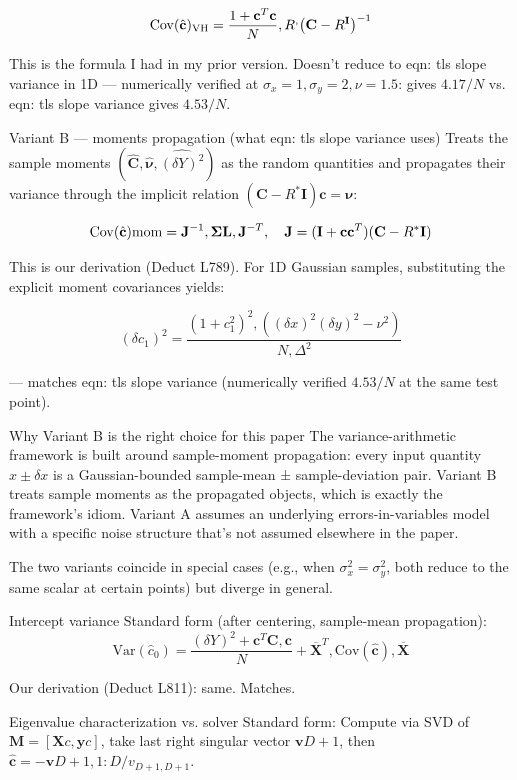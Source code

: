 \documentclass[twoside]{article}
\numberwithin{equation}{section}
\begin{document}
$$\mathrm{Cov}(\hat{\mathbf{c}})_{\rm VH} = \frac{1 + \mathbf{c}^T \mathbf{c}}{N}, R^, \bigl( \mathbf{C} - R^ \mathbf{I} \bigr)^{-1}$$

This is the formula I had in my prior version. Doesn't reduce to eqn: tls slope variance in 1D — numerically verified at $\sigma_x=1, \sigma_y=2, \nu=1.5$: gives $4.17/N$ vs. eqn: tls slope variance gives $4.53/N$.

Variant B — moments propagation (what eqn: tls slope variance uses)
Treats the sample moments $(\hat{\mathbf{C}}, \hat{\boldsymbol\nu}, \widehat{(\delta Y)^2})$ as the random quantities and propagates their variance through the implicit relation $(\mathbf{C} - R^*\mathbf{I})\mathbf{c} = \boldsymbol\nu$:

$$\mathrm{Cov}(\hat{\mathbf{c}}){\rm mom} = \mathbf{J}^{-1}, \boldsymbol\Sigma{\mathbf{L}}, \mathbf{J}^{-T}, \quad \mathbf{J} = (\mathbf{I} + \mathbf{c}\mathbf{c}^T)(\mathbf{C} - R^*\mathbf{I})$$

This is our derivation (Deduct L789). For 1D Gaussian samples, substituting the explicit moment covariances yields:

$$(\delta c_1)^2 = \frac{(1 + c_1^2)^2, ((\delta x)^2 (\delta y)^2 - \nu^2)}{N, \Delta^2}$$

— matches eqn: tls slope variance  (numerically verified $4.53/N$ at the same test point).

Why Variant B is the right choice for this paper
The variance-arithmetic framework is built around sample-moment propagation: every input quantity $x \pm \delta x$ is a Gaussian-bounded sample-mean ± sample-deviation pair. Variant B treats sample moments as the propagated objects, which is exactly the framework's idiom. Variant A assumes an underlying errors-in-variables model with a specific noise structure that's not assumed elsewhere in the paper.

The two variants coincide in special cases (e.g., when $\sigma_x^2 = \sigma_y^2$, both reduce to the same scalar at certain points) but diverge in general.

Intercept variance
Standard form (after centering, sample-mean propagation):
$$\mathrm{Var}(\hat{c}_0) = \frac{(\delta Y)^2 + \mathbf{c}^T \mathbf{C}, \mathbf{c}}{N} + \overline{\mathbf{X}}^T, \mathrm{Cov}(\hat{\mathbf{c}}), \overline{\mathbf{X}}$$

Our derivation (Deduct L811): same.  Matches.

Eigenvalue characterization vs. solver
Standard form: Compute via SVD of $\mathbf{M} = [\mathbf{X}c, \mathbf{y}c]$, take last right singular vector $\mathbf{v}{D+1}$, then $\hat{\mathbf{c}} = -\mathbf{v}{D+1, 1:D}/v_{D+1, D+1}$.
\end{document}
